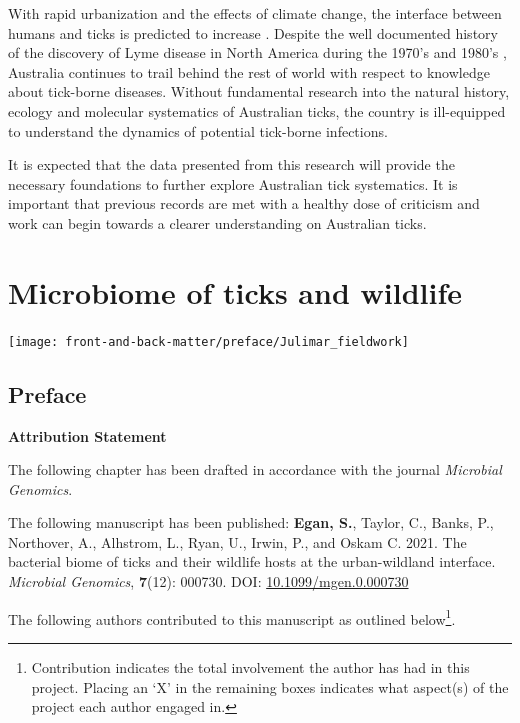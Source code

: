 \documentclass[a4paper, nobind]{templates/ociamthesis}
\renewcommand{\chaptermark}[1]{\markboth{\thechapter. #1}{\thechapter. #1}}
\begin{document}
With rapid urbanization and the effects of climate change, the interface between humans and ticks is predicted to increase \autocite{gilbertImpactsClimateChange2021}.
Despite the well documented history of the discovery of Lyme disease in North America during the 1970's and 1980's \autocite{ostfeldFunctionBiodiversityEcology2000}, Australia continues to trail behind the rest of world with respect to knowledge about tick-borne diseases.
Without fundamental research into the natural history, ecology and molecular systematics of Australian ticks, the country is ill-equipped to understand the dynamics of potential tick-borne infections.

It is expected that the data presented from this research will provide the necessary foundations to further explore Australian tick systematics.
It is important that previous records are met with a healthy dose of criticism and work can begin towards a clearer understanding on Australian ticks.

\hypertarget{wildlife-bacteria}{%
\chapter{Microbiome of ticks and wildlife}\label{wildlife-bacteria}}

\chaptermark{Wildlife biome}

\texttt{[image: front-and-back-matter/preface/Julimar\_fieldwork]}

\newpage

\hypertarget{preface-2}{%
\section*{Preface}\label{preface-2}}

\textbf{Attribution Statement}

The following chapter has been drafted in accordance with the journal \emph{Microbial Genomics}.

The following manuscript has been published: \textbf{Egan, S.}, Taylor, C., Banks, P., Northover, A., Alhstrom, L., Ryan, U., Irwin, P., and Oskam C. 2021. The bacterial biome of ticks and their wildlife hosts at the urban-wildland interface. \emph{Microbial Genomics}, \textbf{7}(12): 000730. DOI: \href{https://doi.org/10.1099/mgen.0.000730}{10.1099/mgen.0.000730}

The following authors contributed to this manuscript as outlined below\footnote{Contribution indicates the total involvement the author has had in this project. Placing an `X' in the remaining boxes indicates what aspect(s) of the project each author engaged in.}.
\end{document}

